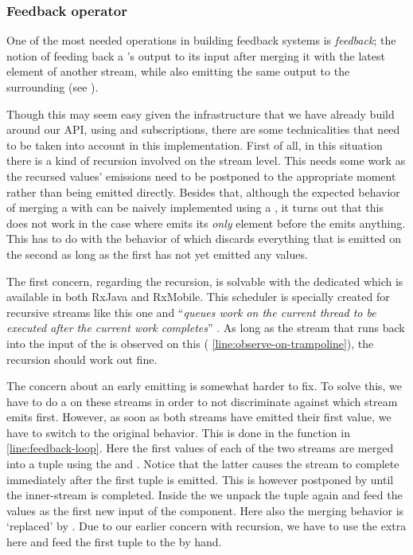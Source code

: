 \subsubsection{Feedback operator}
One of the most needed operations in building feedback systems is \textit{feedback}; the notion of feeding back a \comp's output to its input after merging it with the latest element of another stream, while also emitting the same output to the surrounding \comp (see ).

Though this may seem easy given the infrastructure that we have already build around our API, using  and subscriptions, there are some technicalities that need to be taken into account in this implementation. First of all, in this situation there is a kind of recursion involved on the stream level. This needs some work as the recursed values' emissions need to be postponed to the appropriate moment rather than being emitted directly. Besides that, although the expected behavior of merging a \comp with  can be naively implemented using a , it turns out that this does not work in the case where  emits its \emph{only} element before the \comp emits anything. This has to do with the behavior of  which discards everything that is emitted on the second \obs as long as the first \obs has not yet emitted any values.

The first concern, regarding the recursion, is solvable with the dedicated  which is available in both RxJava and RxMobile. This scheduler is specially created for recursive streams like this one and ``\textit{queues work on the current thread to be executed after the current work completes}'' . As long as the stream that runs back into the input of the \comp is observed on this \sch ( \cref{line:observe-on-trampoline}), the recursion should work out fine.

The concern about an early emitting  is somewhat harder to fix. To solve this, we have to do a  on these streams in order to not discriminate against which stream emits first. However, as soon as both streams have emitted their first value, we have to switch to the original  behavior. This is done in the function  in  \cref{line:feedback-loop}. Here the first values of each of the two streams are merged into a tuple using the  and . Notice that the latter causes the stream to complete immediately after the first tuple is emitted. This  is however postponed by  until the inner-stream is completed. Inside the  we unpack the tuple again and feed the values as the first new input of the  component. Here also the merging behavior is `replaced' by . Due to our earlier concern with recursion, we have to use the extra  here and feed the first tuple to the  by hand.

